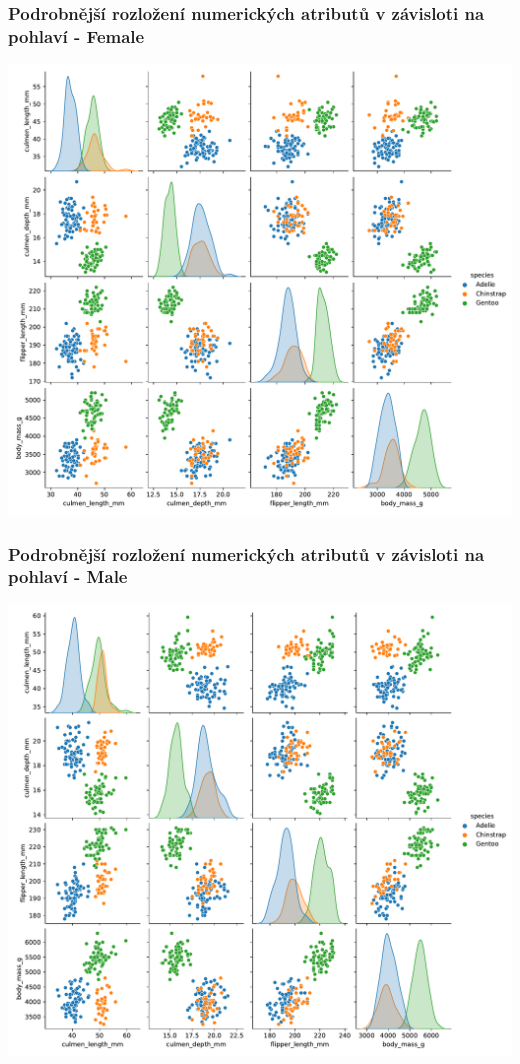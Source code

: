 \documentclass[10pt,xcolor=pdflatex,dvipsnames,table,oneside]{book}
\begin{document}
\subsubsection{Podrobnější rozložení numerických atributů v závisloti na pohlaví - Female}
\includegraphics[width=1.0\textwidth, angle = 0]{img/female.pdf}
\subsubsection{Podrobnější rozložení numerických atributů v závisloti na pohlaví - Male}
\includegraphics[width=1.0\textwidth, angle = 0]{img/male.pdf}
\end{document}
